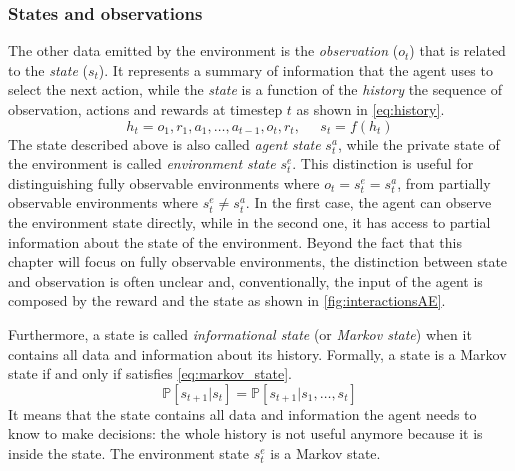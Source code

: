 \subsubsection{States and observations}

The other data emitted by the environment is the \textit{observation} ($o_t$) that is related to the \textit{state} ($s_t$). It represents a summary of information that the agent uses to select the next action, while the \textit{state} is a function of the \textit{history} the sequence of observation, actions and rewards at timestep $t$ as shown in \vref{eq:history}.
\begin{equation}\label{eq:history}
h_t = o_1, r_1, a_1, \dots, a_{t-1}, o_{t}, r_t, \;\;\;\;\; s_t = f(h_t)
\end{equation}
The state described above is also called \textit{agent state} $s_t^a$, while the private state of the environment is called \textit{environment state} $s_t^e$. This distinction is useful for distinguishing fully observable environments where $o_t = s_t^e = s_t^a$, from partially observable environments where $s_t^e \neq s_t^a$.
In the first case, the agent can observe the environment state directly, while in the second one, it has access to partial information about the state of the environment.
Beyond the fact that this chapter will focus on fully observable environments, the distinction between state and observation is often unclear and, conventionally, the input of the agent is composed by the reward and the state as shown in \vref{fig:interactionsAE}.

Furthermore, a state is called \textit{informational state} (or \textit{Markov state}) when it contains all data and information about its history. Formally, a state is a Markov state if and only if satisfies \vref{eq:markov_state}.
\begin{equation} \label{eq:markov_state}
	\mathbb{P}[s_{t+1}| s_t] = \mathbb{P}[s_{t+1} | s_1, \dots, s_t]
\end{equation}
It means that the state contains all data and information the agent needs to know to make decisions: the whole history is not useful anymore because it is inside the state. The environment state $s_t^e$ is a Markov state.

